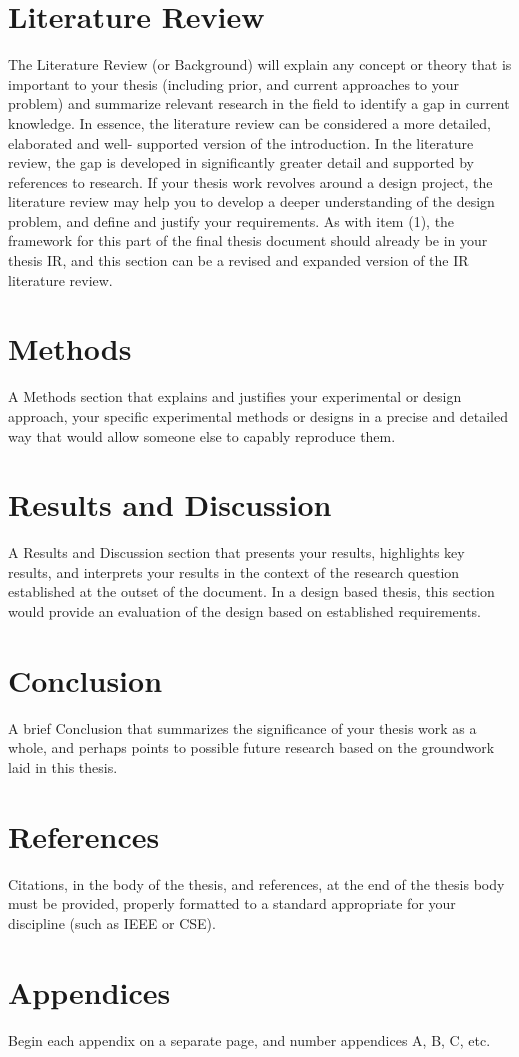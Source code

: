 \documentclass[12pt, a4paper]{article}
\begin{document}
\section{Literature Review}
The Literature Review (or Background) will explain any concept or theory that is important to your thesis (including prior, and current approaches to your problem) and summarize relevant research in the field to identify a gap in current knowledge. In essence, the literature review can be considered a more detailed, elaborated and well- supported version of the introduction. In the literature review, the gap is developed in significantly greater detail and supported by references to research. If your thesis work revolves around a design project, the literature review may help you to develop a deeper understanding of the design problem, and define and justify your requirements. As with item (1), the framework for this part of the final thesis document should already be in your thesis IR, and this section can be a revised and expanded version of the IR literature review.
\pagebreak

\section{Methods}
A Methods section that explains and justifies your experimental or design approach, your specific experimental methods or designs in a precise and detailed way that would allow someone else to capably reproduce them.
\pagebreak

\section{Results and Discussion}
A Results and Discussion section that presents your results, highlights key results, and interprets your results in the context of the research question established at the outset of the document. In a design based thesis, this section would provide an evaluation of the design based on established requirements.
\pagebreak

\section{Conclusion}
A brief Conclusion that summarizes the significance of your thesis work as a whole, and perhaps points to possible future research based on the groundwork laid in this thesis.
\pagebreak

\section{References}
Citations, in the body of the thesis, and references, at the end of the thesis body must be provided, properly formatted to a standard appropriate for your discipline (such as IEEE or CSE).
\pagebreak

\section{Appendices}
Begin each appendix on a separate page, and number appendices A, B, C, etc.
\pagebreak
\end{document}
